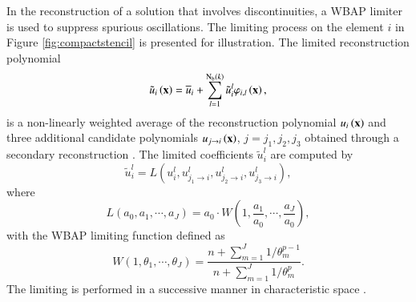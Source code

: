 In the reconstruction of a solution that involves discontinuities, a WBAP limiter \cite{li2011multi,li2012multi} is used to suppress spurious oscillations. The limiting process on the element $i$ in Figure \ref{fig:compactstencil} is presented for illustration. The limited reconstruction polynomial
\begin{equation}\label{eqn:Limited_Polynomial}
    \tilde{u}_{i} \left(\mathbf{x}\right) = \overline{u}_{i} + \sum_{l=1}^{\mathrm{N_b}\left(k\right)} \tilde{u}_i^l \varphi_{i,l}  \left(\mathbf{x}\right),
\end{equation}
is a non-linearly weighted average of the reconstruction polynomial $u_i \left(\mathbf{x}\right)$ and three additional candidate polynomials $u_{j \rightarrow i} \left(\mathbf{x}\right)$, $j=j_1, j_2, j_3$ obtained through a secondary reconstruction \cite{li2012high}. The limited coefficients $\tilde{u}^l_i$ are computed by
\begin{equation}\label{eq:Limiting}
    \tilde{u}_i^l= L\left(u_i^l, u^l_{j_1 \rightarrow i}, u^l_{j_2 \rightarrow i}, u^l_{j_3 \rightarrow i}\right),
\end{equation}
where
\begin{equation}
    L(a_0,a_1,\cdots, a_J)=a_0\cdot{W\left(1,\frac{a_1}{a_0}, \cdots, \frac{a_J}{a_0}\right)},
\end{equation}
with the WBAP limiting function defined as
\begin{equation}
W(1,\theta_1,\cdots, \theta_J)=\frac{n+\sum_{m=1}^{J}{1/\theta_m^{p-1}}}{n+\sum_{m=1}^{J}{1/\theta_m^{p}}}.
\end{equation}
 The limiting is performed in a successive manner in characteristic space \cite{li2012multi}.

